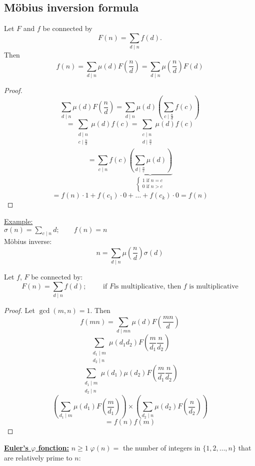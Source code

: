 \documentclass{report}
\begin{document}
\subsection*{M\"{o}bius inversion formula}
Let $F$ and $f$ be connected by \[F(n)=\sum_{d \mid n} f(d).\]
Then 
\[ f(n)=\sum_{d\mid n} \mu(d) F(\frac{n}{d}) = \sum_{d \mid n} \mu(\frac{n}{d}) F(d)\]
\begin{proof}
				\[ \sum_{d\mid n} \mu(d) F(\frac{n}{d}) = \sum_{d \mid n} \mu(d)(\sum_{c\mid \frac{n}{d}} f(c))\]
				\[ = \sum_{\substack{
													d\mid n\\
													c\mid \frac{n}{d}\\}}
						\mu(d) f(c)= \sum_{\substack{
													c\mid n\\
													d\mid \frac{n}{c}\\}}
						\mu(d) f(c)
													\]
				\[ = \sum_{c \mid n} f(c)\underbrace{(\sum_{d \mid \frac{n}{c}} \mu(d))}_{\left \{
										\begin{array}{ccc}
										1 \text{ if } n=c\\
										0 \text{ if } n>c\\
										\end{array}
							\right.}
				\]
				\[=f(n)\cdot 1 +f(c_1)\cdot 0+ \dots +f(c_k) \cdot 0 = f(n)\]
\end{proof}
\underline{Example:} \\
$\sigma(n) = \sum_{c \mid n} d ; \qquad f(n)=n$\\
M\"{o}bius inverse: \[ n= \sum_{d \mid n} \mu(\frac{n}{d}) \sigma(d)\]
\begin{thm}
				Let $f$, $F$ be connected by:
					\[F(n)=\sum_{d \mid n} f(d) ;\qquad \text{ if }F\text{is multiplicative, then }f\text{ is multiplicative}\]
\end{thm}
\begin{proof}
		Let $\gcd(m,n)=1$. Then 
													\[ f(mn)=\sum_{d \mid mn} \mu(d) F(\frac{mn}{d})\]
													\[\sum_{\substack{d_1 \mid m \\ d_2 \mid n}} \mu(d_1 d_2) F(\frac{m}{d_1} \frac{n}{d_2})\]
													\[\sum_{\substack{d_1 \mid m \\d_2 \mid n}} \mu(d_1) \mu(d_2) F(\frac{m}{d_1} \frac{n}{d_2})\]
													\[(\sum_{d_1 \mid m} \mu(d_1) F(\frac{m}{d_1})) \times (\sum_{d_2 \mid n} \mu(d_2) F(\frac{n}{d_2}))\]
													\[=f(n)f(m)\]
\end{proof}
\textbf{\underline{Euler's $\varphi$ fonction:}} $n\geq 1 \; \varphi(n)=$ the number of integers in $\{1,2,\dots,n\}$ that are relatively prime to $n$:
\end{document}

